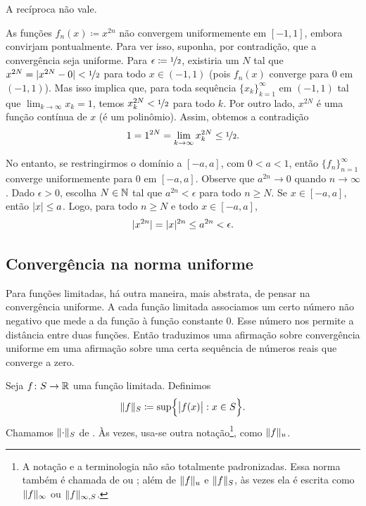 A recíproca não vale.

\begin{example}
As funções $f_n(x) \coloneqq x^{2n}$ não convergem uniformemente em $[-1,1]$,
embora convirjam pontualmente. Para ver isso, suponha, por contradição, que
a convergência seja uniforme. Para $\epsilon \coloneqq \nicefrac{1}{2}$,
existiria um $N$ tal que $x^{2N}=\lvert {x^{2N}-0} \rvert<\nicefrac{1}{2}$ para todo
$x\in(-1,1)$ (pois $f_n(x)$ converge para 0 em $(-1,1)$). Mas isso implica
que, para toda sequência $\{x_k\}_{k=1}^\infty$ em $(-1,1)$ tal que
$\lim_{k\to\infty}x_k=1$, temos $x_k^{2N}<\nicefrac{1}{2}$ para todo $k$.
Por outro lado, $x^{2N}$ é uma função contínua de $x$ (é um polinômio).
Assim, obtemos a contradição
\begin{equation*}
1 = 1^{2N}  = \lim_{k\to\infty} x_k^{2N} \leq \nicefrac{1}{2} .
\end{equation*}

No entanto, se restringirmos o domínio a $[-a,a]$, com $0<a<1$, então
$\{f_n\}_{n=1}^\infty$ converge uniformemente para 0 em $[-a,a]$. Observe
que $a^{2n}\to0$ quando $n\to\infty$. Dado $\epsilon>0$, escolha
$N\in{\mathbb{N}}$ tal que $a^{2n}<\epsilon$ para todo $n\geq N$.
Se $x\in[-a,a]$, então $\lvert {x} \rvert\leq a$. Logo, para todo $n\geq N$ e
todo $x\in[-a,a]$,
\begin{equation*}
\lvert {x^{2n}} \rvert = \lvert {x} \rvert^{2n} \leq a^{2n} < \epsilon .
\end{equation*}
\end{example}

\subsection{Convergência na norma uniforme}

Para funções limitadas, há outra maneira, mais abstrata, de pensar na
convergência uniforme. A cada função limitada associamos um certo número
não negativo que mede a  da função à função constante
$0$. Esse número nos permite  a distância entre duas
funções. Então traduzimos uma afirmação sobre convergência uniforme em uma
afirmação sobre uma certa sequência de números reais que converge a zero.

\begin{defn} \label{def:unifnorm}
Seja $f \colon S \to {\mathbb{R}}$ uma função limitada. Definimos
\begin{equation*}
\snorm{f}_S \coloneqq
\sup \Bigl\{ \babs{f(x)} : x \in S \Bigr\} .
\avoidbreak
\end{equation*}
Chamamos $\lVert {\cdot} \rVert_S$ de \emph{}.
Às vezes, usa-se outra notação\footnote{A notação e a terminologia não
são totalmente padronizadas. Essa norma também é chamada de
\emph{} ou
\emph{}; além de $\lVert {f} \rVert_u$ e $\lVert {f} \rVert_S$,
às vezes ela é escrita como $\lVert {f} \rVert_{\infty}$ ou
$\lVert {f} \rVert_{\infty,S}$.}, como $\lVert {f} \rVert_u$.
\end{defn}

